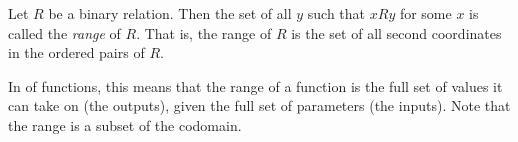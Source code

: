 \documentclass[12pt]{article}
\begin{document}
Let $R$ be a binary relation.  Then the set of all $y$ such that $x R y$ for some $x$ is called the \emph{range} of $R$.  That is, the range of $R$ is the set of all second coordinates in the ordered pairs of $R$.

In  of functions, this means that the range of a function is the full set of values it can take on (the outputs), given the full set of parameters (the inputs).  Note that the range is a subset of the codomain.
\end{document}
